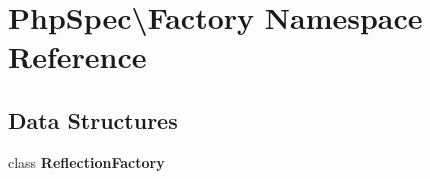 \section{Php\+Spec\textbackslash{}Factory Namespace Reference}
\label{namespace_php_spec_1_1_factory}
\subsection*{Data Structures}
\begin{DoxyCompactItemize}
\item 
class {\bf Reflection\+Factory}
\end{DoxyCompactItemize}
